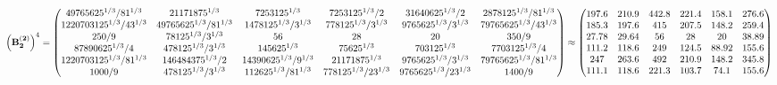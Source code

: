 \documentclass[10pt,a4paper]{article}
\begin{document}
	\[
		\left(\bold{B_2^{(2)}}\right)^{4} = 
		\begin{pmatrix}
			{{4}{9765625^ {1 / 3}}} / {{81^ {1 / 3}}} & {{2}{1171875^ {1 / 3}}}{} & {{7}{253125^ {1 / 3}}}{} & {{7}{253125^ {1 / 3}}} / {{2}} & {{31640625^ {1 / 3}}} / {{2}} & {{28}{78125^ {1 / 3}}} / {{81^ {1 / 3}}} \\
			{{1220703125^ {1 / 3}}} / {{4}{3^ {1 / 3}}} & {{4}{9765625^ {1 / 3}}} / {{81^ {1 / 3}}} & {{14}{78125^ {1 / 3}}} / {{3^ {1 / 3}}} & {{7}{78125^ {1 / 3}}} / {{3^ {1 / 3}}} & {{9765625^ {1 / 3}}} / {{3^ {1 / 3}}} & {{7}{9765625^ {1 / 3}}} / {{4}{3^ {1 / 3}}} \\
			{{250}} / {{9}} & {{78125^ {1 / 3}}} / {{3^ {1 / 3}}} & {{56}}{} & {{28}}{} & {{20}}{} & {{350}} / {{9}} \\
			{{87890625^ {1 / 3}}} / {{4}} & {{4}{78125^ {1 / 3}}} / {{3^ {1 / 3}}} & {{14}{5625^ {1 / 3}}}{} & {{7}{5625^ {1 / 3}}}{} & {{703125^ {1 / 3}}}{} & {{7}{703125^ {1 / 3}}} / {{4}} \\
			{{1220703125^ {1 / 3}}} / {{81^ {1 / 3}}} & {{146484375^ {1 / 3}}} / {{2}} & {{14}{390625^ {1 / 3}}} / {{9^ {1 / 3}}} & {{2}{1171875^ {1 / 3}}}{} & {{9765625^ {1 / 3}}} / {{3^ {1 / 3}}} & {{7}{9765625^ {1 / 3}}} / {{81^ {1 / 3}}} \\
			{{1000}} / {{9}} & {{4}{78125^ {1 / 3}}} / {{3^ {1 / 3}}} & {{112}{625^ {1 / 3}}} / {{81^ {1 / 3}}} & {{7}{78125^ {1 / 3}}} / {{2}{3^ {1 / 3}}} & {{9765625^ {1 / 3}}} / {{2}{3^ {1 / 3}}} & {{1400}} / {{9}} \\
		\end{pmatrix}
		\approx
		\begin{pmatrix}
			197.6    & 210.9    & 442.8    & 221.4    & 158.1    & 276.6    \\
			185.3    & 197.6    & 415      & 207.5    & 148.2    & 259.4    \\
			27.78    & 29.64    & 56       & 28       & 20       & 38.89    \\
			111.2    & 118.6    & 249      & 124.5    & 88.92    & 155.6    \\
			247      & 263.6    & 492      & 210.9    & 148.2    & 345.8    \\
			111.1    & 118.6    & 221.3    & 103.7    & 74.1     & 155.6    \\
		\end{pmatrix}
	\]
\end{document}
